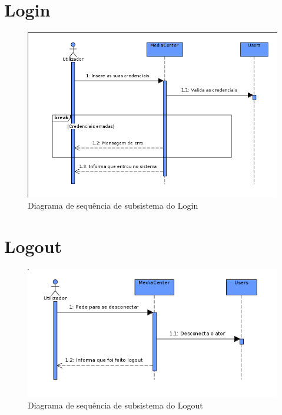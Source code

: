 \documentclass[a4paper]{report}
\begin{document}
\section{Login}
\begin{figure}[H]
	\centering 
    \includegraphics[width=\textwidth]{images/loginSub.png}  
    \caption{Diagrama de sequência de subsistema do Login}
\end{figure}

\section{Logout}
\begin{figure}[H]
	\centering 
    \includegraphics[width=\textwidth]{images/logoutSub.png}  
    \caption{Diagrama de sequência de subsistema do Logout}
\end{figure}
\end{document}
